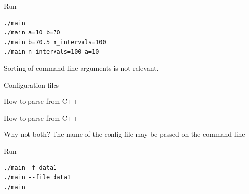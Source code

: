 \documentclass[10pt]{beamer}
\begin{document}

\begin{frame}[fragile]{Run}

    \begin{verbatim}
./main
./main a=10 b=70
./main b=70.5 n_intervals=100
./main n_intervals=100 a=10
    \end{verbatim}

    \vspace{1cm}
    
   	Sorting of command line arguments is not relevant.

\end{frame}


\begin{frame}[fragile]{Configuration files}
    
\end{frame}


\begin{frame}[fragile]{How to parse from C++}
    
\end{frame}


\begin{frame}[fragile]{How to parse from C++}
    
\end{frame}


\begin{frame}[fragile]{Why not both?}
    The name of the config file may be passed on the command line
        
    
\end{frame}


\begin{frame}[fragile]{Run}
    \begin{verbatim}
./main -f data1
./main --file data1
./main
    \end{verbatim}
\end{frame}
\end{document}
